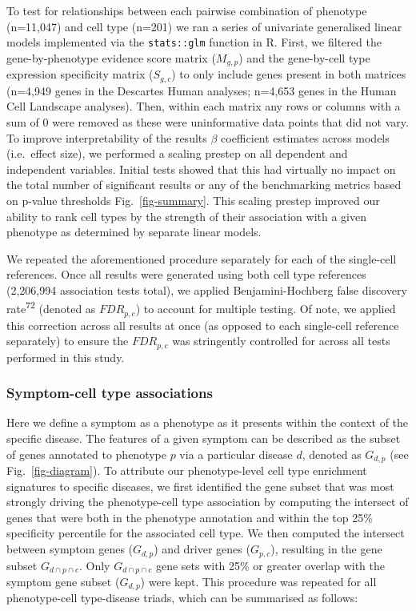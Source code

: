 \documentclass[
sn-nature
]{sn-jnl}
\begin{document}
To test for relationships between each pairwise combination of phenotype
(n=11,047) and cell type (n=201) we ran a series of univariate
generalised linear models implemented via the \texttt{stats::glm}
function in R. First, we filtered the gene-by-phenotype evidence score
matrix (\(M _{g,p}\)) and the gene-by-cell type expression specificity
matrix (\(S _{g,c}\)) to only include genes present in both matrices
(n=4,949 genes in the Descartes Human analyses; n=4,653 genes in the
Human Cell Landscape analyses). Then, within each matrix any rows or
columns with a sum of 0 were removed as these were uninformative data
points that did not vary. To improve interpretability of the results
\(\beta\) coefficient estimates across models (i.e.~effect size), we
performed a scaling prestep on all dependent and independent variables.
Initial tests showed that this had virtually no impact on the total
number of significant results or any of the benchmarking metrics based
on p-value thresholds Fig.~\ref{fig-summary}. This scaling prestep
improved our ability to rank cell types by the strength of their
association with a given phenotype as determined by separate linear
models.

We repeated the aforementioned procedure separately for each of the
single-cell references. Once all results were generated using both cell
type references (2,206,994 association tests total), we applied
Benjamini-Hochberg false discovery rate\textsuperscript{72} (denoted as
\(FDR_{p,c}\)) to account for multiple testing. Of note, we applied this
correction across all results at once (as opposed to each single-cell
reference separately) to ensure the \(FDR_{p,c}\) was stringently
controlled for across all tests performed in this study.

\subsubsection{Symptom-cell type
associations}\label{symptom-cell-type-associations}

Here we define a symptom as a phenotype as it presents within the
context of the specific disease. The features of a given symptom can be
described as the subset of genes annotated to phenotype \(p\) via a
particular disease \(d\), denoted as \(G_{d,p}\) (see
Fig.~\ref{fig-diagram}). To attribute our phenotype-level cell type
enrichment signatures to specific diseases, we first identified the gene
subset that was most strongly driving the phenotype-cell type
association by computing the intersect of genes that were both in the
phenotype annotation and within the top 25\% specificity percentile for
the associated cell type. We then computed the intersect between symptom
genes (\(G_{d,p}\)) and driver genes (\(G_{p,c}\)), resulting in the
gene subset \(G_{d \cap p \cap c}\). Only \(G_{d \cap p \cap c}\) gene
sets with 25\% or greater overlap with the symptom gene subset
(\(G_{d,p}\)) were kept. This procedure was repeated for all
phenotype-cell type-disease triads, which can be summarised as follows:
\end{document}
